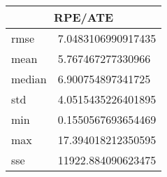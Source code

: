 \begin{table}[!ht] 
 \centering 
 \begin{tabular}{|l|l|} \hline 
 \multicolumn{2}{|c|}{RPE/ATE} \\ \hline 
 rmse & 7.0483106990917435 \\ \hline 
mean & 5.767467277330966 \\ \hline 
median & 6.900754897341725 \\ \hline 
std & 4.0515435226401895 \\ \hline 
min & 0.1550567693654469 \\ \hline 
max & 17.394018212350595 \\ \hline 
sse & 11922.884090623475 \\ \hline 
\end{tabular} 
 \end{table}
